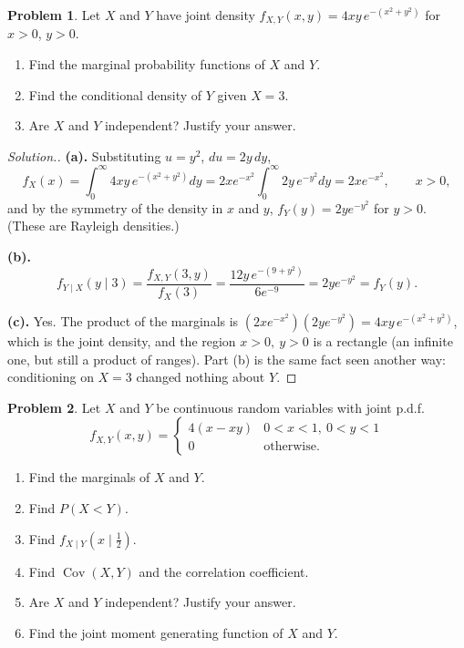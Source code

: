 \documentclass[12pt,a4paper]{report}
\theoremstyle{definition}
\theoremstyle{plain}
\theoremstyle{definition}
\newtheorem{problemx}{Problem}[section]
\newenvironment{problem}{\begin{problemx}}{\end{problemx}}
\newenvironment{solution}
  {\renewcommand{\qedsymbol}{}\begin{proof}[\textit{Solution}.]}
  {\end{proof}}
\begin{document}
\begin{problem}
Let $X$ and $Y$ have joint density $f_{X,Y}(x,y) = 4xy\,e^{-(x^{2}+y^{2})}$ for $x>0$,
$y>0$.
\begin{enumerate}
\item[(a).] Find the marginal probability functions of $X$ and $Y$.
\item[(b).] Find the conditional density of $Y$ given $X=3$.
\item[(c).] Are $X$ and $Y$ independent? Justify your answer.
\end{enumerate}
\end{problem}

\begin{solution}
\textbf{(a).} Substituting $u = y^{2}$, $du = 2y\,dy$,
\[f_X(x) = \int_0^{\infty}4xy\,e^{-(x^{2}+y^{2})}dy
 = 2xe^{-x^{2}}\int_0^{\infty}2y\,e^{-y^{2}}dy = 2xe^{-x^{2}},\qquad x>0,\]
and by the symmetry of the density in $x$ and $y$, $f_Y(y) = 2ye^{-y^{2}}$ for $y>0$.
(These are Rayleigh densities.)

\textbf{(b).} \[f_{Y\mid X}(y\mid 3) = \frac{f_{X,Y}(3,y)}{f_X(3)}
 = \frac{12y\,e^{-(9+y^{2})}}{6e^{-9}} = 2ye^{-y^{2}} = f_Y(y).\]

\textbf{(c).} Yes. The product of the marginals is
$\left(2xe^{-x^{2}}\right)\left(2ye^{-y^{2}}\right) = 4xy\,e^{-(x^{2}+y^{2})}$, which is
the joint density, and the region $x>0,\ y>0$ is a rectangle (an infinite one, but still a
product of ranges). Part (b) is the same fact seen another way: conditioning on $X=3$
changed nothing about $Y$.
\end{solution}

\begin{problem}
Let $X$ and $Y$ be continuous random variables with joint p.d.f.
\[f_{X,Y}(x,y) = \begin{cases}4(x-xy) & 0<x<1,\ 0<y<1\\ 0 & \text{otherwise.}\end{cases}\]
\begin{enumerate}
\item[(a).] Find the marginals of $X$ and $Y$.
\item[(b).] Find $P(X<Y)$.
\item[(c).] Find $f_{X\mid Y}\!\left(x\mid \tfrac12\right)$.
\item[(d).] Find $\operatorname{Cov}(X,Y)$ and the correlation coefficient.
\item[(e).] Are $X$ and $Y$ independent? Justify your answer.
\item[(f).] Find the joint moment generating function of $X$ and $Y$.
\end{enumerate}
\end{problem}
\end{document}

